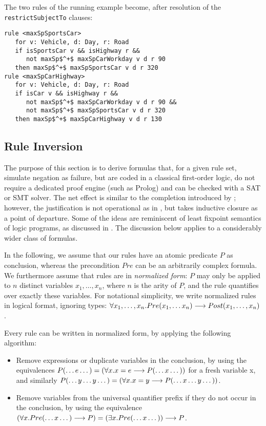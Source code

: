 \begin{example} The two rules of the running example become, after resolution
  of the \texttt{restrictSubjectTo} clauses:
\begin{lstlisting}[mathescape=true]
rule <maxSpSportsCar>
   for v: Vehicle, d: Day, r: Road
   if isSportsCar v && isHighway r &&
      not maxSp$^+$ maxSpCarWorkday v d r 90
   then maxSp$^+$ maxSpSportsCar v d r 320
rule <maxSpCarHighway>
   for v: Vehicle, d: Day, r: Road
   if isCar v && isHighway r &&
      not maxSp$^+$ maxSpCarWorkday v d r 90 &&
      not maxSp$^+$ maxSpSportsCar v d r 320
   then maxSp$^+$ maxSpCarHighway v d r 130
\end{lstlisting}
\end{example}

\subsection{Rule Inversion}\label{sec:rule_inversion}

The purpose of this section is to derive formulas that, for a given rule set,
simulate negation as failure, but are coded in a classical first-order logic,
do not require a dedicated proof engine (such as Prolog) and can be checked
with a SAT or SMT solver. The net effect is similar to the completion
introduced by \cite{clark_NegAsFailure_1978}; however, the justification
is not operational as in \cite{clark_NegAsFailure_1978}, but takes inductive
closure as a point of departure. Some of the ideas are reminiscent of least
fixpoint semantics of logic programs, as discussed in
\cite{falaschi_etal_declarative_logic_langauges_1989,fages_consistency_clark_completion_1994}.
The discussion below applies to a considerably wider class of formulas.

In the following, we assume that our rules have an atomic predicate $P$ as
conclusion, whereas the precondition $Pre$ can be an arbitrarily complex
formula.  We furthermore assume that rules are in \emph{normalized form}: $P$
may only be applied to $n$ distinct variables $x_1, \dots, x_n$, where $n$ is
the arity of $P$, and the rule quantifies over exactly these variables.
For notational simplicity, we write normalized rules in logical format,
ignoring types:
$\forall x_1, \dots, x_n. Pre(x_1, \dots x_n) \longrightarrow Post(x_1, \dots, x_n)$.

Every rule can be written in normalized form, by applying the following
algorithm:
\begin{itemize}
\item Remove expressions or duplicate variables in the conclusion, by using
  the equivalences $P(\dots e \dots) = (\forall x. x = e \longrightarrow P(\dots x
  \dots))$ for a fresh variable x, and similarly $P(\dots y \dots y \dots) =
  (\forall x. x = y   \longrightarrow P(\dots x \dots y \dots))$.
\item Remove variables from the universal quantifier prefix if they do not
  occur in the conclusion, by using the equivalence
  $(\forall x. Pre(\dots x \dots) \longrightarrow P) = (\exists x. Pre(\dots x \dots))
  \longrightarrow P$.
\end{itemize}

